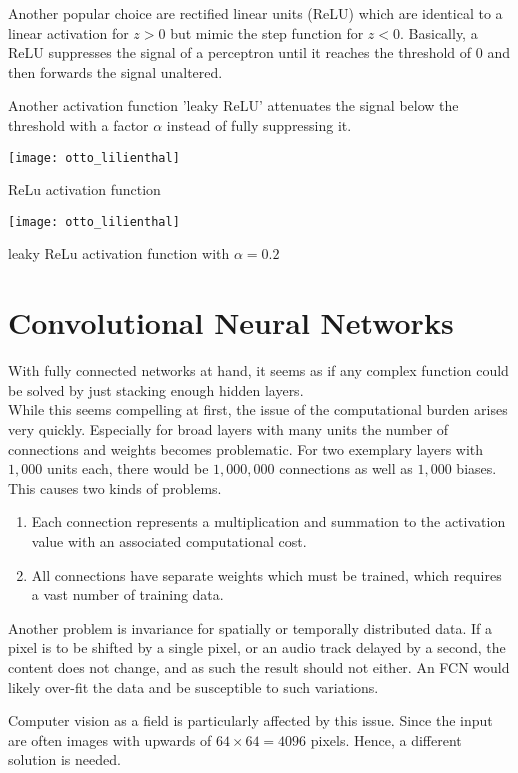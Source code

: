 Another popular choice are rectified linear units (ReLU) which are identical to a linear activation for $z > 0$ but mimic the step function for $z < 0$.
Basically, a ReLU suppresses the signal of a perceptron until it reaches the threshold of $0$ and then forwards the signal unaltered.

Another activation function 'leaky ReLU' attenuates the signal below the threshold with a factor $\alpha$ instead of fully suppressing it.
\begin{marginfigure}
    \texttt{[image: otto\_lilienthal]}
    \caption[]{ReLu activation function}
\end{marginfigure}
\begin{marginfigure}
    \texttt{[image: otto\_lilienthal]}
    \caption[]{leaky ReLu activation function with $\alpha = 0.2$}
\end{marginfigure}

\section[Convolutional NNs]{Convolutional Neural Networks}
With fully connected networks at hand, it seems as if any complex function could be solved by just stacking enough hidden layers.\\
While this seems compelling at first, the issue of the computational burden arises very quickly.
Especially for broad layers with many units the number of connections and weights becomes problematic.
For two exemplary layers with $1,000$ units each, there would be $1,000,000$ connections as well as $1,000$ biases.
This causes two kinds of problems.
\begin{enumerate}
    \item Each connection represents a multiplication and summation to the activation value with an associated computational cost.
    \item All connections have separate weights which must be trained, which requires a vast number of training data.
\end{enumerate}

Another problem is invariance for spatially or temporally distributed data.
If a pixel is to be shifted by a single pixel, or an audio track delayed by a second, the content does not change, and as such the result should not either.
An FCN would likely over-fit the data and be susceptible to such variations.

Computer vision as a field is particularly affected by this issue.
Since the input are often images with upwards of $64 \times 64 = 4096$ pixels.
Hence, a different solution is needed.

